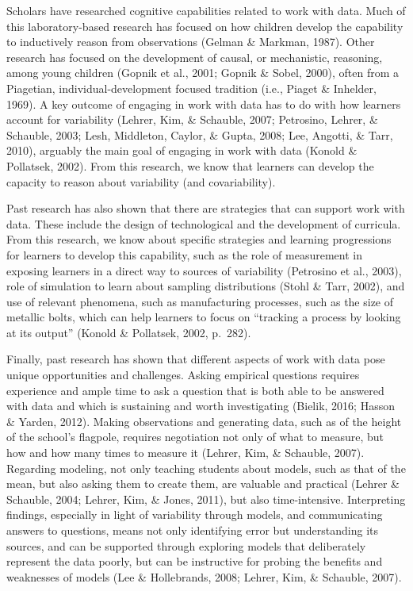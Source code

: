 \documentclass[]{msu-thesis}
\theoremstyle{definition}
\theoremstyle{definition}
\theoremstyle{definition}
\theoremstyle{remark}
\begin{document}
Scholars have researched cognitive capabilities related to work with
data. Much of this laboratory-based research has focused on how children
develop the capability to inductively reason from observations (Gelman
\& Markman, 1987). Other research has focused on the development of
causal, or mechanistic, reasoning, among young children (Gopnik et al.,
2001; Gopnik \& Sobel, 2000), often from a Piagetian,
individual-development focused tradition (i.e., Piaget \& Inhelder,
1969). A key outcome of engaging in work with data has to do with how
learners account for variability (Lehrer, Kim, \& Schauble, 2007;
Petrosino, Lehrer, \& Schauble, 2003; Lesh, Middleton, Caylor, \& Gupta,
2008; Lee, Angotti, \& Tarr, 2010), arguably the main goal of engaging
in work with data (Konold \& Pollatsek, 2002). From this research, we
know that learners can develop the capacity to reason about variability
(and covariability).

Past research has also shown that there are strategies that can support
work with data. These include the design of technological and the
development of curricula. From this research, we know about specific
strategies and learning progressions for learners to develop this
capability, such as the role of measurement in exposing learners in a
direct way to sources of variability (Petrosino et al., 2003), role of
simulation to learn about sampling distributions (Stohl \& Tarr, 2002),
and use of relevant phenomena, such as manufacturing processes, such as
the size of metallic bolts, which can help learners to focus on
``tracking a process by looking at its output'' (Konold \& Pollatsek,
2002, p.~282).

Finally, past research has shown that different aspects of work with
data pose unique opportunities and challenges. Asking empirical
questions requires experience and ample time to ask a question that is
both able to be answered with data and which is sustaining and worth
investigating (Bielik, 2016; Hasson \& Yarden, 2012). Making
observations and generating data, such as of the height of the school's
flagpole, requires negotiation not only of what to measure, but how and
how many times to measure it (Lehrer, Kim, \& Schauble, 2007). Regarding
modeling, not only teaching students about models, such as that of the
mean, but also asking them to create them, are valuable and practical
(Lehrer \& Schauble, 2004; Lehrer, Kim, \& Jones, 2011), but also
time-intensive. Interpreting findings, especially in light of
variability through models, and communicating answers to questions,
means not only identifying error but understanding its sources, and can
be supported through exploring models that deliberately represent the
data poorly, but can be instructive for probing the benefits and
weaknesses of models (Lee \& Hollebrands, 2008; Lehrer, Kim, \&
Schauble, 2007).
\end{document}
